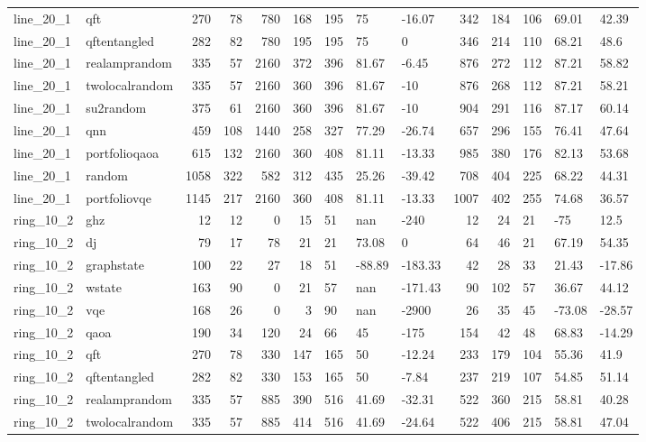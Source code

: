 \begin{longtable}{llrrrrlllrrlll}
line\_20\_1 & qft & 270 & 78 & 780 & 168 & 195 & 75 & -16.07 & 342 & 184 & 106 & 69.01 & 42.39 \\
line\_20\_1 & qftentangled & 282 & 82 & 780 & 195 & 195 & 75 & 0 & 346 & 214 & 110 & 68.21 & 48.6 \\
line\_20\_1 & realamprandom & 335 & 57 & 2160 & 372 & 396 & 81.67 & -6.45 & 876 & 272 & 112 & 87.21 & 58.82 \\
line\_20\_1 & twolocalrandom & 335 & 57 & 2160 & 360 & 396 & 81.67 & -10 & 876 & 268 & 112 & 87.21 & 58.21 \\
line\_20\_1 & su2random & 375 & 61 & 2160 & 360 & 396 & 81.67 & -10 & 904 & 291 & 116 & 87.17 & 60.14 \\
line\_20\_1 & qnn & 459 & 108 & 1440 & 258 & 327 & 77.29 & -26.74 & 657 & 296 & 155 & 76.41 & 47.64 \\
line\_20\_1 & portfolioqaoa & 615 & 132 & 2160 & 360 & 408 & 81.11 & -13.33 & 985 & 380 & 176 & 82.13 & 53.68 \\
line\_20\_1 & random & 1058 & 322 & 582 & 312 & 435 & 25.26 & -39.42 & 708 & 404 & 225 & 68.22 & 44.31 \\
line\_20\_1 & portfoliovqe & 1145 & 217 & 2160 & 360 & 408 & 81.11 & -13.33 & 1007 & 402 & 255 & 74.68 & 36.57 \\
ring\_10\_2 & ghz & 12 & 12 & 0 & 15 & 51 & nan & -240 & 12 & 24 & 21 & -75 & 12.5 \\
ring\_10\_2 & dj & 79 & 17 & 78 & 21 & 21 & 73.08 & 0 & 64 & 46 & 21 & 67.19 & 54.35 \\
ring\_10\_2 & graphstate & 100 & 22 & 27 & 18 & 51 & -88.89 & -183.33 & 42 & 28 & 33 & 21.43 & -17.86 \\
ring\_10\_2 & wstate & 163 & 90 & 0 & 21 & 57 & nan & -171.43 & 90 & 102 & 57 & 36.67 & 44.12 \\
ring\_10\_2 & vqe & 168 & 26 & 0 & 3 & 90 & nan & -2900 & 26 & 35 & 45 & -73.08 & -28.57 \\
ring\_10\_2 & qaoa & 190 & 34 & 120 & 24 & 66 & 45 & -175 & 154 & 42 & 48 & 68.83 & -14.29 \\
ring\_10\_2 & qft & 270 & 78 & 330 & 147 & 165 & 50 & -12.24 & 233 & 179 & 104 & 55.36 & 41.9 \\
ring\_10\_2 & qftentangled & 282 & 82 & 330 & 153 & 165 & 50 & -7.84 & 237 & 219 & 107 & 54.85 & 51.14 \\
ring\_10\_2 & realamprandom & 335 & 57 & 885 & 390 & 516 & 41.69 & -32.31 & 522 & 360 & 215 & 58.81 & 40.28 \\
ring\_10\_2 & twolocalrandom & 335 & 57 & 885 & 414 & 516 & 41.69 & -24.64 & 522 & 406 & 215 & 58.81 & 47.04 \\

\end{longtable}
